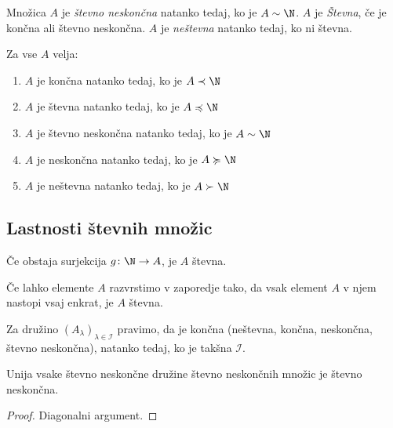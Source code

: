 \documentclass[12pt, a4paper]{article}
\begin{document}
\begin{definicija}
Množica $A$ je \emph{števno neskončna} natanko tedaj, ko je $A\sim \N$. $A$ je \emph{Števna}, če je končna ali števno neskončna. $A$ je \emph{neštevna} natanko tedaj, ko ni števna.
\end{definicija}

\begin{izrek}
Za vse $A$ velja:

\begin{enumerate}
\item $A$ je končna natanko tedaj, ko je $A\prec\N$
\item $A$ je števna natanko tedaj, ko je $A\preccurlyeq\N$
\item $A$ je števno neskončna natanko tedaj, ko je $A\sim\N$
\item $A$ je neskončna natanko tedaj, ko je $A\succcurlyeq\N$
\item $A$ je neštevna natanko tedaj, ko je $A\succ\N$
\end{enumerate}
\end{izrek}

\newpage

\subsection{Lastnosti števnih množic}

\begin{trditev}
Če obstaja surjekcija $g\colon\N\to A$, je $A$ števna.
\end{trditev}

\obvs

\begin{posledica}
Če lahko elemente $A$ razvrstimo v zaporedje tako, da vsak element $A$ v njem nastopi vsaj enkrat, je $A$ števna.
\end{posledica}

\begin{definicija}
Za družino $(A_\lambda)_{\lambda\in\mathcal{I}}$ pravimo, da je končna (neštevna, končna,
neskončna, števno neskončna), natanko tedaj, ko je takšna $\mathcal{I}$.
\end{definicija}

\begin{izrek}
Unija vsake števno neskončne družine števno neskončnih množic je števno neskončna.
\end{izrek}

\begin{proof}
Diagonalni argument.
\end{proof}
\end{document}
